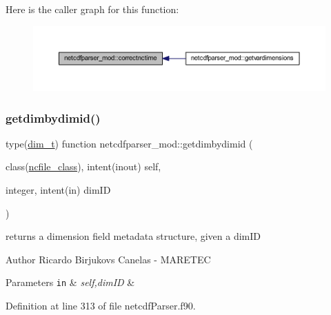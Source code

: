Here is the caller graph for this function\+:\nopagebreak
\begin{figure}[H]
\begin{center}
\leavevmode
\includegraphics[width=350pt]{namespacenetcdfparser__mod_af93319fde6cf6baedb7fe27bf3396e7b_icgraph}
\end{center}
\end{figure}
\mbox{\label{namespacenetcdfparser__mod_a5fcd4b7fb27dbc9befd0a6fcfb9929a1}} 
\subsubsection{\texorpdfstring{getdimbydimid()}{getdimbydimid()}}
{\footnotesize\ttfamily type(\mbox{\hyperlink{structnetcdfparser__mod_1_1dim__t}{dim\+\_\+t}}) function netcdfparser\+\_\+mod\+::getdimbydimid (\begin{DoxyParamCaption}\item[{class(\mbox{\hyperlink{structnetcdfparser__mod_1_1ncfile__class}{ncfile\+\_\+class}}), intent(inout)}]{self,  }\item[{integer, intent(in)}]{dim\+ID }\end{DoxyParamCaption})\hspace{0.3cm}{\ttfamily [private]}}



returns a dimension field metadata structure, given a dim\+ID 

\begin{DoxyAuthor}{Author}
Ricardo Birjukovs Canelas -\/ M\+A\+R\+E\+T\+EC 
\end{DoxyAuthor}

\begin{DoxyParams}[1]{Parameters}
\mbox{\tt in}  & {\em self,dim\+ID} & \\
\hline
\end{DoxyParams}


Definition at line 313 of file netcdf\+Parser.\+f90.


